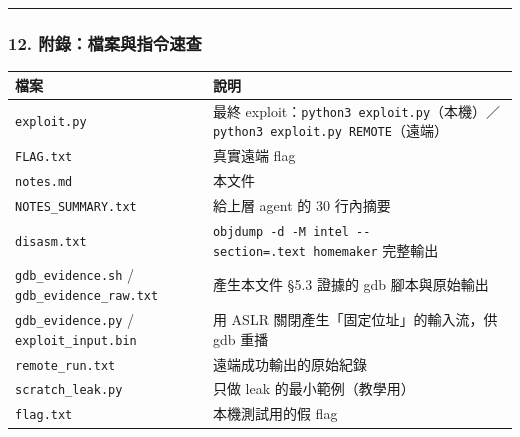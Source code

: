 \documentclass[10pt,a4paper]{article}
\newcounter{none}
\begin{document}
\begin{center}\rule{0.5\linewidth}{0.5pt}\end{center}

\subsubsection{12.
附錄：檔案與指令速查}\label{ux9644ux9304ux6a94ux6848ux8207ux6307ux4ee4ux901fux67e5}

{\def\LTcaptype{none} %
\begin{longtable}[]{@{}
  >{\raggedright\arraybackslash}p{}
  >{\raggedright\arraybackslash}p{}@{}}
\toprule\noalign{}
\begin{minipage}[b]{\linewidth}\raggedright
檔案
\end{minipage} & \begin{minipage}[b]{\linewidth}\raggedright
說明
\end{minipage} \\
\midrule\noalign{}
\endhead
\bottomrule\noalign{}
\endlastfoot
\texttt{exploit.\allowbreak{}py} & 最終
exploit：\texttt{python3\ \allowbreak{}exploit.\allowbreak{}py}（本機）／\texttt{python3\ \allowbreak{}exploit.\allowbreak{}py\ \allowbreak{}REMOTE}（遠端） \\
\texttt{FLAG.\allowbreak{}txt} & 真實遠端 flag \\
\texttt{notes.\allowbreak{}md} & 本文件 \\
\texttt{NOTES\_\allowbreak{}SUMMARY.\allowbreak{}txt} & 給上層 agent 的 30 行內摘要 \\
\texttt{disasm.\allowbreak{}txt} &
\texttt{objdump\ \allowbreak{}-\allowbreak{}d\ \allowbreak{}-\allowbreak{}M\ \allowbreak{}intel\ \allowbreak{}-\allowbreak{}\/\allowbreak{}-\allowbreak{}section=.\allowbreak{}text\ \allowbreak{}homemaker}
完整輸出 \\
\texttt{gdb\_\allowbreak{}evidence.\allowbreak{}sh} / \texttt{gdb\_\allowbreak{}evidence\_\allowbreak{}raw.\allowbreak{}txt} & 產生本文件
§5.3 證據的 gdb 腳本與原始輸出 \\
\texttt{gdb\_\allowbreak{}evidence.\allowbreak{}py} / \texttt{exploit\_\allowbreak{}input.\allowbreak{}bin} & 用 ASLR
關閉產生「固定位址」的輸入流，供 gdb 重播 \\
\texttt{remote\_\allowbreak{}run.\allowbreak{}txt} & 遠端成功輸出的原始紀錄 \\
\texttt{scratch\_\allowbreak{}leak.\allowbreak{}py} & 只做 leak 的最小範例（教學用） \\
\texttt{flag.\allowbreak{}txt} & 本機測試用的假 flag \\
\end{longtable}
}
\end{document}

